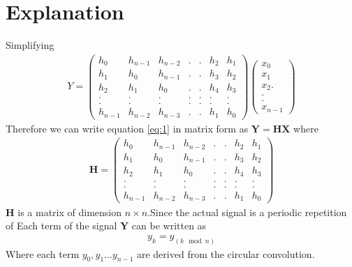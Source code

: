\documentclass[journal,12pt,twocolumn]{IEEEtran}
\newcommand{\myvec}[1]{\ensuremath{\begin{pmatrix}#1\end{pmatrix}}}
\numberwithin{equation}{subsection}
\let\vec\mathbf
\begin{document}
\section{Explanation}
Simplifying
\begin{align}
    Y=\myvec{h_0&h_{n-1}&h_{n-2}&.&.&h_2&h_1\\h_1&h_0&h_{n-1}&.&.&h_3&h_2\\h_2&h_1&h_0&.&.&h_4&h_3\\.&.&.&.&.&.&.\\.&.&.&.&.&.&.\\h_{n-1}&h_{n-2}&h_{n-3}&.&.&h_1&h_0}\myvec{x_0\\x_1\\x_2.\\.\\.\\x_{n-1}}
\end{align}
Therefore we can write equation \eqref{eq:1} in matrix form as $\vec{Y}=\vec{H}\vec{X}$ where
\begin{align}
    \vec{H}=\myvec{h_0&h_{n-1}&h_{n-2}&.&.&h_2&h_1\\h_1&h_0&h_{n-1}&.&.&h_3&h_2\\h_2&h_1&h_0&.&.&h_4&h_3\\.&.&.&.&.&.&.\\.&.&.&.&.&.&.\\h_{n-1}&h_{n-2}&h_{n-3}&.&.&h_1&h_0}
\end{align}
$\vec{H}$ is a matrix of dimension $n\times n$.Since the actual signal is a periodic repetition of Each term of the signal $\vec{Y}$ can be written as
\begin{align}
    y_k=y_{(k\mod n)}
\end{align}
Where each term $y_0,y_1...y_{n-1}$ are derived from the circular convolution.
\end{document}
